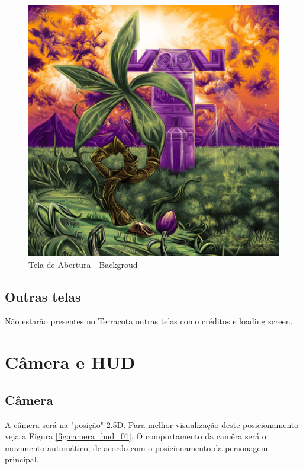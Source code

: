 \documentclass[12pt]{article}
\begin{document}
\begin{figure}[!htb]
    \centering
    \includegraphics[scale=0.4]{background_terracota.jpg}
    \caption{Tela de Abertura - Backgroud}
    \label{fig:background_terracota}
\end{figure}

\subsection{Outras telas}
Não estarão presentes no Terracota outras telas como créditos e loading screen.

\newpage
\section{Câmera e HUD}

\subsection{Câmera}
A câmera será na "posição" 2.5D. Para melhor visualização deste posicionamento
veja a Figura \ref{fig:camera_hud_01}. O comportamento da camêra será o movimento automático, de
acordo com o posicionamento da personagem principal.
\end{document}
